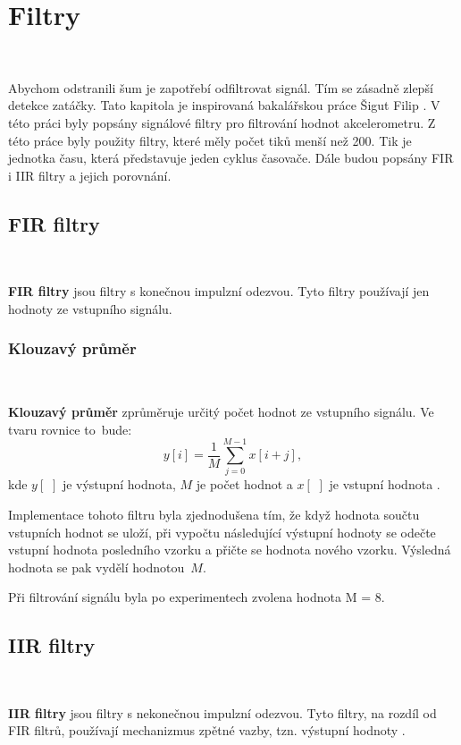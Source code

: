 \chapter{Filtry}
\label{sec:Filters}
\vspace{-30pt}
\

Abychom odstranili šum je zapotřebí odfiltrovat signál. Tím se zásadně zlepší
detekce zatáčky. Tato kapitola je inspirovaná bakalářskou práce Šigut Filip  \cite{krokomer}.
V této práci byly popsány signálové filtry pro filtrování hodnot akcelerometru. Z této práce byly použity filtry, které měly počet tiků menší než 200. Tik je jednotka času, která představuje jeden cyklus časovače. Dále budou popsány FIR i IIR filtry a jejich porovnání.

\section{FIR filtry}\

\textbf{FIR filtry} jsou filtry s konečnou impulzní odezvou. Tyto filtry používají
jen hodnoty ze vstupního signálu\cite{FIR}.

\subsection{Klouzavý průměr}\

\textbf{Klouzavý průměr} zprůměruje určitý počet hodnot ze vstupního signálu. Ve
tvaru rovnice to~bude:
\begin{equation}
y[i] = \frac{1}{M}\sum_{j = 0}^{M - 1}x[i+j],
\end{equation}
kde $y[\,\,]$ je výstupní hodnota, $M$ je počet hodnot a $x[\,\,]$ je vstupní
hodnota \cite{Filters}.

Implementace tohoto filtru byla zjednodušena tím, že když hodnota součtu vstupních
hodnot se uloží, při vypočtu následující výstupní hodnoty se odečte vstupní hodnota
posledního vzorku a přičte se hodnota nového vzorku. Výsledná hodnota se pak vydělí
hodnotou~$M$\cite{krokomer}.

Při filtrování signálu byla po experimentech zvolena hodnota M = 8.

\section{IIR filtry}\

\textbf{IIR filtry} jsou filtry s nekonečnou impulzní odezvou. Tyto filtry, na
rozdíl od FIR filtrů, používají mechanizmus zpětné vazby, tzn. výstupní
hodnoty \cite{IIR}.

